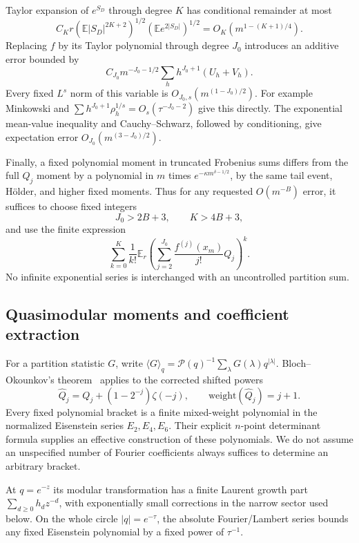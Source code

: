 \documentclass[11pt]{article}
\theoremstyle{remark}\newtheorem{remark}[theorem]{Remark}
\newcommand{\E}{\mathbb E}
\newcommand{\cP}{\mathcal P}
\begin{document}
Taylor expansion of $e^{S_D}$ through degree $K$ has conditional remainder at most
\[
 C_Kr(\E|S_D|^{2K+2})^{1/2}(\E e^{2|S_D|})^{1/2}
 =O_K(m^{1-(K+1)/4}).
\]
Replacing $f$ by its Taylor polynomial through degree $J_0$ introduces an additive error bounded by
\[
 C_{J_0}m^{-J_0-1/2}\sum_h h^{J_0+1}(U_h+V_h).
\]
Every fixed $L^s$ norm of this variable is $O_{J_0,s}(m^{(1-J_0)/2})$. For example Minkowski and
$\sum h^{J_0+1}\rho_h^{1/s}=O_s(\tau^{-J_0-2})$ give this directly. The exponential mean-value inequality and Cauchy--Schwarz, followed by conditioning, give expectation error $O_{J_0}(m^{(3-J_0)/2})$.

Finally, a fixed polynomial moment in truncated Frobenius sums differs from the full $Q_j$ moment by a polynomial in $m$ times $e^{-\kappa m^{\delta-1/2}}$, by the same tail event, Hölder, and higher fixed moments. Thus for any requested $O(m^{-B})$ error, it suffices to choose fixed integers
\[
 J_0>2B+3,\qquad K>4B+3,
\]
and use the finite expression
\begin{equation}\label{stp:sum:eq:finiteTaylor}
 \sum_{k=0}^K\frac1{k!}\E_r
 \left(\sum_{j=2}^{J_0}\frac{f^{(j)}(x_m)}{j!}Q_j\right)^k.
\end{equation}
No infinite exponential series is interchanged with an uncontrolled partition sum.

\subsection{Quasimodular moments and coefficient extraction}
For a partition statistic $G$, write
$\langle G\rangle_q=\cP(q)^{-1}\sum_\lambda G(\lambda)q^{|\lambda|}$.
Bloch--Okounkov's theorem~\cite{BO} applies to the corrected shifted powers
\begin{equation}\label{stp:sum:eq:shiftcorrect}
 \widehat Q_j=Q_j+(1-2^{-j})\zeta(-j),\qquad
 \mathrm{weight}(\widehat Q_j)=j+1.
\end{equation}
Every fixed polynomial bracket is a finite mixed-weight polynomial in the normalized Eisenstein series $E_2,E_4,E_6$. Their explicit $n$-point determinant formula supplies an effective construction of these polynomials. We do not assume an unspecified number of Fourier coefficients always suffices to determine an arbitrary bracket.

At $q=e^{-z}$ its modular transformation has a finite Laurent growth part $\sum_{d\ge0}h_dz^{-d}$, with exponentially small corrections in the narrow sector used below. On the whole circle $|q|=e^{-\tau}$, the absolute Fourier/Lambert series bounds any fixed Eisenstein polynomial by a fixed power of $\tau^{-1}$.
\end{document}
